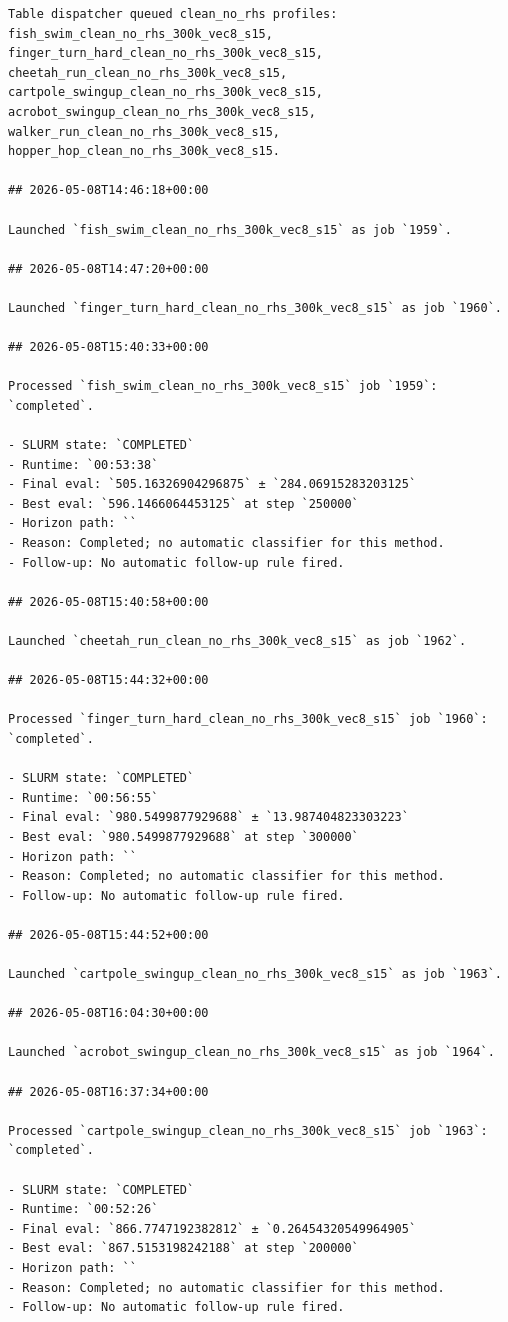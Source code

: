 \begin{verbatim}
Table dispatcher queued clean_no_rhs profiles: fish_swim_clean_no_rhs_300k_vec8_s15, finger_turn_hard_clean_no_rhs_300k_vec8_s15, cheetah_run_clean_no_rhs_300k_vec8_s15, cartpole_swingup_clean_no_rhs_300k_vec8_s15, acrobot_swingup_clean_no_rhs_300k_vec8_s15, walker_run_clean_no_rhs_300k_vec8_s15, hopper_hop_clean_no_rhs_300k_vec8_s15.

## 2026-05-08T14:46:18+00:00

Launched `fish_swim_clean_no_rhs_300k_vec8_s15` as job `1959`.

## 2026-05-08T14:47:20+00:00

Launched `finger_turn_hard_clean_no_rhs_300k_vec8_s15` as job `1960`.

## 2026-05-08T15:40:33+00:00

Processed `fish_swim_clean_no_rhs_300k_vec8_s15` job `1959`: `completed`.

- SLURM state: `COMPLETED`
- Runtime: `00:53:38`
- Final eval: `505.16326904296875` ± `284.06915283203125`
- Best eval: `596.1466064453125` at step `250000`
- Horizon path: ``
- Reason: Completed; no automatic classifier for this method.
- Follow-up: No automatic follow-up rule fired.

## 2026-05-08T15:40:58+00:00

Launched `cheetah_run_clean_no_rhs_300k_vec8_s15` as job `1962`.

## 2026-05-08T15:44:32+00:00

Processed `finger_turn_hard_clean_no_rhs_300k_vec8_s15` job `1960`: `completed`.

- SLURM state: `COMPLETED`
- Runtime: `00:56:55`
- Final eval: `980.5499877929688` ± `13.987404823303223`
- Best eval: `980.5499877929688` at step `300000`
- Horizon path: ``
- Reason: Completed; no automatic classifier for this method.
- Follow-up: No automatic follow-up rule fired.

## 2026-05-08T15:44:52+00:00

Launched `cartpole_swingup_clean_no_rhs_300k_vec8_s15` as job `1963`.

## 2026-05-08T16:04:30+00:00

Launched `acrobot_swingup_clean_no_rhs_300k_vec8_s15` as job `1964`.

## 2026-05-08T16:37:34+00:00

Processed `cartpole_swingup_clean_no_rhs_300k_vec8_s15` job `1963`: `completed`.

- SLURM state: `COMPLETED`
- Runtime: `00:52:26`
- Final eval: `866.7747192382812` ± `0.26454320549964905`
- Best eval: `867.5153198242188` at step `200000`
- Horizon path: ``
- Reason: Completed; no automatic classifier for this method.
- Follow-up: No automatic follow-up rule fired.


\end{verbatim}
